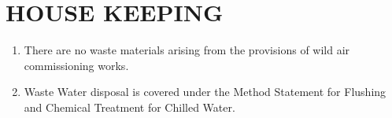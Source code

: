 \section{HOUSE KEEPING}
\begin{enumerate}
\item	There are no waste materials arising from the provisions of wild air commissioning works.
\item	Waste Water disposal is covered under the Method Statement for Flushing and Chemical Treatment for Chilled Water.
\end{enumerate}